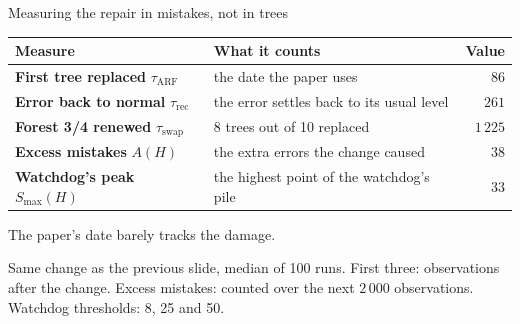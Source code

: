\documentclass[aspectratio=169,11pt]{beamer}
\begin{document}
\begin{frame}{Measuring the repair in mistakes, not in trees}
  \begin{center}
    \small
    \begin{tabular}{@{}llr@{}}
      \toprule
      Measure & What it counts & Value \\
      \midrule
      \textbf{First tree replaced} {\scriptsize\color{gray}$\tau_{\mathrm{ARF}}$}
        & the date the paper uses & $86$ \\
      \textbf{Error back to normal} {\scriptsize\color{gray}$\tau_{\mathrm{rec}}$}
        & the error settles back to its usual level & $261$ \\
      \textbf{Forest 3/4 renewed} {\scriptsize\color{gray}$\tau_{\mathrm{swap}}$}
        & 8 trees out of 10 replaced & $1\,225$ \\
      \midrule
      \textbf{Excess mistakes} {\scriptsize\color{gray}$A(H)$}
        & the extra errors the change caused & $38$ \\
      \textbf{Watchdog's peak} {\scriptsize\color{gray}$S_{\max}(H)$}
        & the highest point of the watchdog's pile & $33$ \\
      \bottomrule
    \end{tabular}
  \end{center}
  \begin{center}
    \alert{The paper's date barely tracks the damage.}
  \end{center}
  \vfill
  {\scriptsize\color{gray} Same change as the previous slide, median of 100 runs.
  First three: observations after the change. Excess mistakes: counted over the
  next $2\,000$ observations. Watchdog thresholds: 8, 25 and 50.\par}
\end{frame}
\end{document}
